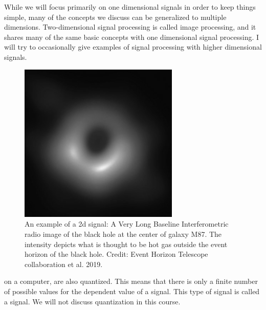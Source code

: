 While we will focus primarily on one dimensional signals in order to keep things simple, many of the concepts we discuss can be generalized to multiple dimensions. 
Two-dimensional signal processing is called image processing, and it shares many of the same basic concepts with one dimensional signal processing. 
I will try to occasionally give examples of signal processing with higher dimensional signals.


\begin{figure}
\begin{center}
\includegraphics[width=0.68\textwidth]{code/004_dft_2d/bhi.png}
\end{center}
\caption{An example of a 2d signal: A Very Long Baseline Interferometric radio image of
the black hole at the center of galaxy M87. The intensity depicts what is thought to be hot gas outside the event horizon of the black hole. Credit: Event Horizon Telescope collaboration et al. 2019.}
\label{fig:bh_example}
\end{figure}

 on a computer, are also quantized. This means that there is only a finite number of possible values for the dependent value of a signal. 
This type of signal is called a \emph{} signal. We will not discuss quantization in this course.


